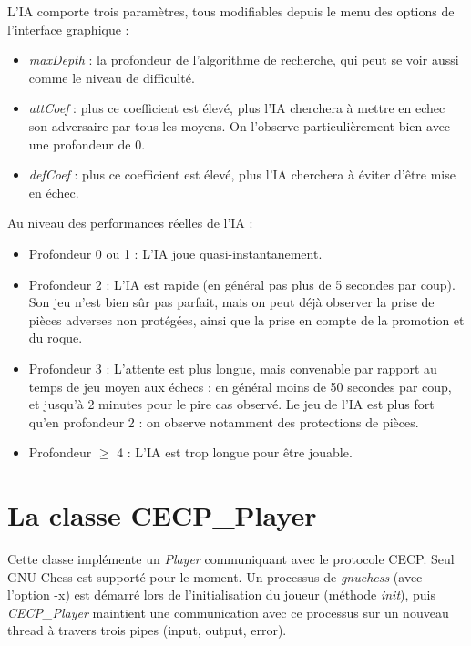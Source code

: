 \documentclass[11pt]{article}
\begin{document}
\-

L'IA comporte trois paramètres, tous modifiables depuis le menu des options de l'interface graphique :
\begin{itemize}
\item \textit{maxDepth} : la profondeur de l'algorithme de recherche, qui peut se voir aussi comme le niveau de difficulté.
\item \textit{attCoef} : plus ce coefficient est élevé, plus l'IA cherchera à mettre en echec son adversaire par tous les moyens. On l'observe particulièrement bien avec une profondeur de 0.
\item \textit{defCoef} : plus ce coefficient est élevé, plus l'IA cherchera à éviter d'être mise en échec.
\end{itemize}

\-

Au niveau des performances réelles de l'IA :
\begin{itemize}
\item Profondeur 0 ou 1 : L'IA joue quasi-instantanement.
\item Profondeur 2 : L'IA est rapide (en général pas plus de 5 secondes par coup). Son jeu n'est bien sûr pas parfait, mais on peut déjà observer la prise de pièces adverses non protégées, ainsi que la prise en compte de la promotion et du roque.
\item Profondeur 3 : L'attente est plus longue, mais convenable par rapport au temps de jeu moyen aux échecs : en général moins de 50 secondes par coup, et jusqu'à 2 minutes pour le pire cas observé. Le jeu de l'IA est plus fort qu'en profondeur 2 : on observe notamment des protections de pièces.
\item Profondeur $\geq$ 4 : L'IA est trop longue pour être jouable.
\end{itemize}

\section{La classe CECP\_Player}

Cette classe implémente un \textit{Player} communiquant avec le protocole CECP. Seul GNU-Chess est supporté pour le moment.
Un processus de \textsl{gnuchess} (avec l'option -x) est démarré lors de l'initialisation du joueur (méthode \textit{init}),
puis \textit{CECP\_Player} maintient une communication avec ce processus sur un nouveau thread à travers trois pipes (input, output, error).

\-
\end{document}
